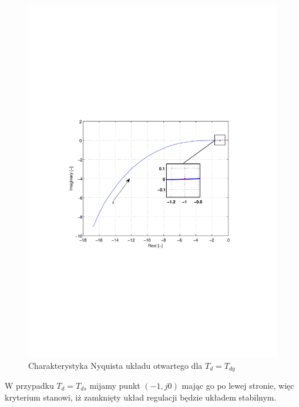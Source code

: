 \documentclass[12pt]{article}
\begin{document}
\begin{figure}[!htb] 
	\begin{center}
		\includegraphics[trim=5cm 9cm 5cm 9cm]{../res/img/2-1-0,55_nyq.pdf} 
	\end{center}
	\caption{Charakterystyka Nyquista układu otwartego dla $T_{d}=T_{dg}$}
\end{figure}

\newpage

W przypadku $T_{d}=T_{ds}$ mijamy punkt $(-1, j0)$ mając go po lewej stronie, więc
kryterium stanowi, iż zamknięty układ regulacji będzie układem stabilnym.
\end{document}
